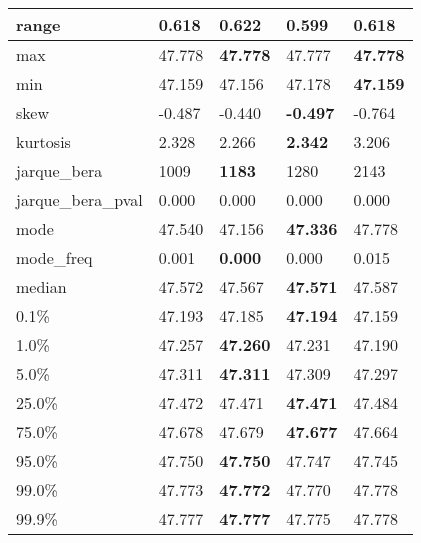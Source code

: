 \begin{table}[H]
\begin{tabular}{|l|m{10em}|m{10em}|m{10em}|m{10em}|}
\hline range & 0.618 & 0.622 & \cellcolor[rgb]{0.9, 0.54, 0.52} 0.599 & \bfseries 0.618 \\
\hline max & 47.778 & \bfseries 47.778 & \cellcolor[rgb]{0.9, 0.54, 0.52} 47.777 & \bfseries 47.778 \\
\hline min & 47.159 & 47.156 & \cellcolor[rgb]{0.9, 0.54, 0.52} 47.178 & \bfseries 47.159 \\
\hline skew & -0.487 & -0.440 & \bfseries -0.497 & \cellcolor[rgb]{0.9, 0.54, 0.52} -0.764 \\
\hline kurtosis & 2.328 & 2.266 & \bfseries 2.342 & \cellcolor[rgb]{0.9, 0.54, 0.52} 3.206 \\
\hline jarque\_bera & 1009 & \bfseries 1183 & 1280 & \cellcolor[rgb]{0.9, 0.54, 0.52} 2143 \\
\hline jarque\_bera\_pval & 0.000 & 0.000 & 0.000 & 0.000 \\
\hline mode & 47.540 & \cellcolor[rgb]{0.9, 0.54, 0.52} 47.156 & \bfseries 47.336 & 47.778 \\
\hline mode\_freq & 0.001 & \bfseries 0.000 & 0.000 & \cellcolor[rgb]{0.9, 0.54, 0.52} 0.015 \\
\hline median & 47.572 & 47.567 & \bfseries 47.571 & \cellcolor[rgb]{0.9, 0.54, 0.52} 47.587 \\
\hline 0.1\% & 47.193 & 47.185 & \bfseries 47.194 & \cellcolor[rgb]{0.9, 0.54, 0.52} 47.159 \\
\hline 1.0\% & 47.257 & \bfseries 47.260 & 47.231 & \cellcolor[rgb]{0.9, 0.54, 0.52} 47.190 \\
\hline 5.0\% & 47.311 & \bfseries 47.311 & 47.309 & \cellcolor[rgb]{0.9, 0.54, 0.52} 47.297 \\
\hline 25.0\% & 47.472 & 47.471 & \bfseries 47.471 & \cellcolor[rgb]{0.9, 0.54, 0.52} 47.484 \\
\hline 75.0\% & 47.678 & 47.679 & \bfseries 47.677 & \cellcolor[rgb]{0.9, 0.54, 0.52} 47.664 \\
\hline 95.0\% & 47.750 & \bfseries 47.750 & 47.747 & \cellcolor[rgb]{0.9, 0.54, 0.52} 47.745 \\
\hline 99.0\% & 47.773 & \bfseries 47.772 & 47.770 & \cellcolor[rgb]{0.9, 0.54, 0.52} 47.778 \\
\hline 99.9\% & 47.777 & \bfseries 47.777 & \cellcolor[rgb]{0.9, 0.54, 0.52} 47.775 & 47.778 \\
\hline
\end{tabular}
\end{table}
